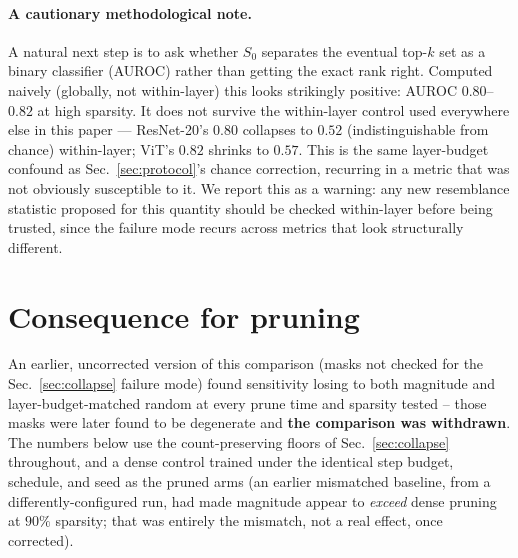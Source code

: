 \documentclass{article}
\begin{document}
\paragraph{A cautionary methodological note.} A natural next step is to ask whether $S_0$
separates the eventual top-$k$ set as a binary classifier (AUROC) rather than getting the
exact rank right. Computed naively (globally, not within-layer) this looks strikingly
positive: AUROC $0.80$--$0.82$ at high sparsity. It does not survive the within-layer
control used everywhere else in this paper --- ResNet-20's $0.80$ collapses to $0.52$
(indistinguishable from chance) within-layer; ViT's $0.82$ shrinks to $0.57$. This is the
same layer-budget confound as Sec.~\ref{sec:protocol}'s chance correction, recurring in a
metric that was not obviously susceptible to it. We report this as a warning: any new
resemblance statistic proposed for this quantity should be checked within-layer before
being trusted, since the failure mode recurs across metrics that look structurally
different.

\section{Consequence for pruning}
\label{sec:consequence}
An earlier, uncorrected version of this comparison (masks not checked for the
Sec.~\ref{sec:collapse} failure mode) found sensitivity losing to both magnitude and
layer-budget-matched random at every prune time and sparsity tested -- those masks were
later found to be degenerate and \textbf{the comparison was withdrawn}. The numbers below
use the count-preserving floors of Sec.~\ref{sec:collapse} throughout, and a dense control
trained under the identical step budget, schedule, and seed as the pruned arms (an earlier
mismatched baseline, from a differently-configured run, had made magnitude appear to
\emph{exceed} dense pruning at $90\%$ sparsity; that was entirely the mismatch, not a real
effect, once corrected).
\end{document}
